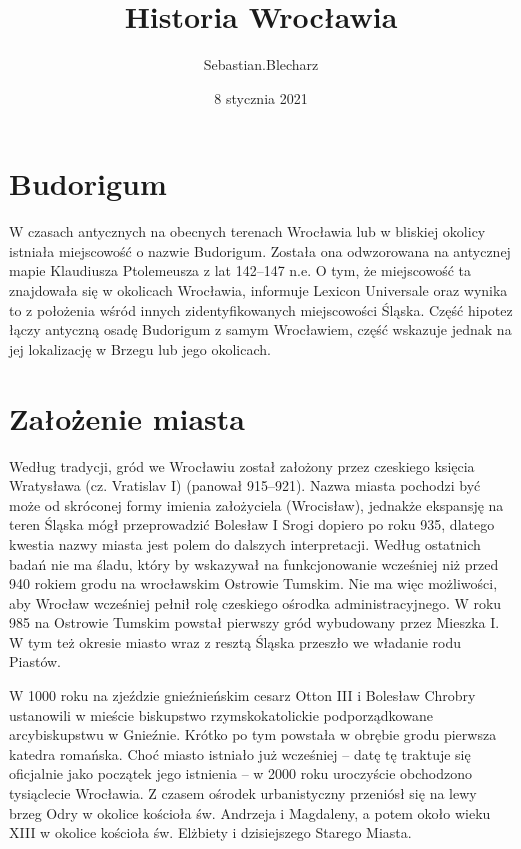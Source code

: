 \documentclass{article}
\title{Historia Wrocławia}
\author{Sebastian.Blecharz }
\date{8 stycznia 2021}
\begin{document}
\maketitle

\tableofcontents

\newpage
\section{Budorigum}
W czasach antycznych na obecnych terenach Wrocławia lub w bliskiej okolicy istniała miejscowość o nazwie Budorigum. Została ona odwzorowana na antycznej mapie Klaudiusza Ptolemeusza z lat 142–147 n.e. O tym, że miejscowość ta znajdowała się w okolicach Wrocławia, informuje Lexicon Universale oraz wynika to z położenia wśród innych zidentyfikowanych miejscowości Śląska. Część hipotez łączy antyczną osadę Budorigum z samym Wrocławiem, część wskazuje jednak na jej lokalizację w Brzegu lub jego okolicach.

\section{Założenie miasta}
Według tradycji, gród we Wrocławiu został założony przez czeskiego księcia Wratysława (cz. Vratislav I) (panował 915–921). Nazwa miasta pochodzi być może od skróconej formy imienia założyciela (Wrocisław), jednakże ekspansję na teren Śląska mógł przeprowadzić Bolesław I Srogi dopiero po roku 935, dlatego kwestia nazwy miasta jest polem do dalszych interpretacji. Według ostatnich badań nie ma śladu, który by wskazywał na funkcjonowanie wcześniej niż przed 940 rokiem grodu na wrocławskim Ostrowie Tumskim. Nie ma więc możliwości, aby Wrocław wcześniej pełnił rolę czeskiego ośrodka administracyjnego. W roku 985 na Ostrowie Tumskim powstał pierwszy gród wybudowany przez Mieszka I. W tym też okresie miasto wraz z resztą Śląska przeszło we władanie rodu Piastów.

W 1000 roku na zjeździe gnieźnieńskim cesarz Otton III i Bolesław Chrobry ustanowili w mieście biskupstwo rzymskokatolickie podporządkowane arcybiskupstwu w Gnieźnie. Krótko po tym powstała w obrębie grodu pierwsza katedra romańska. Choć miasto istniało już wcześniej – datę tę traktuje się oficjalnie jako początek jego istnienia – w 2000 roku uroczyście obchodzono tysiąclecie Wrocławia. Z czasem ośrodek urbanistyczny przeniósł się na lewy brzeg Odry w okolice kościoła św. Andrzeja i Magdaleny, a potem około wieku XIII w okolice kościoła św. Elżbiety i dzisiejszego Starego Miasta.
 
\end{document}
